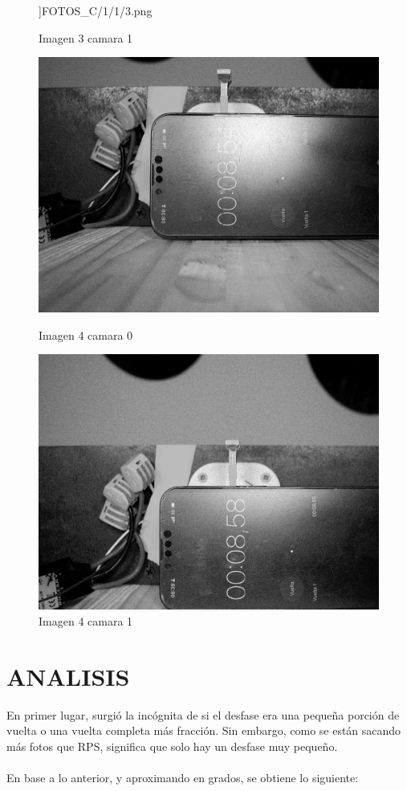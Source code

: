 \documentclass{article}
\begin{document}
\begin{figure}[H]
\begin{minipage}[b]{0.45\textwidth}
    \textwidth]{FOTOS_C/1/1/3.png}
    \caption{Imagen 3 camara 1}
  \end{minipage}
  \begin{minipage}[b]{0.45\textwidth}
    \centering
    \includegraphics[width=0.8
    \textwidth]{FOTOS_C/1/0/4.png}
    \caption{Imagen 4 camara 0}
  \end{minipage}
  \begin{minipage}[b]{0.45\textwidth}
    \centering
    \includegraphics[width=0.8
    \textwidth]{FOTOS_C/1/1/4.png}
    \caption{Imagen 4 camara 1}
  \end{minipage}
\end{figure}

\newpage
\section {ANALISIS}

\noindent En primer lugar, surgió la incógnita de si el desfase era una pequeña porción de vuelta o una vuelta completa más fracción. Sin embargo, como se están sacando más fotos que RPS, significa que solo hay un desfase muy pequeño.
\\ \\
En base a lo anterior, y aproximando en grados, se obtiene lo siguiente:
\end{document}
